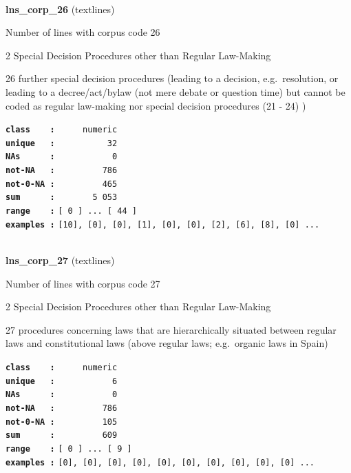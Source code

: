 \documentclass[]{article}
\begin{document}
~

\textbf{lns\_corp\_26} (textlines)

Number of lines with corpus code 26

2 Special Decision Procedures other than Regular Law-Making

26 further special decision procedures (leading to a decision,
e.g.~resolution, or leading to a decree/act/bylaw (not mere debate or
question time) but cannot be coded as regular law-making nor special
decision procedures (21 - 24) )

\textbf{\texttt{class\ \ \ \ :}} \texttt{~~~~~numeric}\\
\textbf{\texttt{unique\ \ \ :}} \texttt{~~~~~~~~~~32}\\
\textbf{\texttt{NAs\ \ \ \ \ \ :}} \texttt{~~~~~~~~~~~0}\\
\textbf{\texttt{not-NA\ \ \ :}} \texttt{~~~~~~~~~786}\\
\textbf{\texttt{not-0-NA\ :}} \texttt{~~~~~~~~~465}\\
\textbf{\texttt{sum\ \ \ \ \ \ :}} \texttt{~~~~~~~5~053}\\
\textbf{\texttt{range\ \ \ \ :}}
\texttt{{[}\ 0\ {]}\ ...\ {[}\ 44\ {]}}\\
\textbf{\texttt{examples\ :}}
\texttt{{[}10{]},\ {[}0{]},\ {[}0{]},\ {[}1{]},\ {[}0{]},\ {[}0{]},\ {[}2{]},\ {[}6{]},\ {[}8{]},\ {[}0{]}\ ...}\\

~

\textbf{lns\_corp\_27} (textlines)

Number of lines with corpus code 27

2 Special Decision Procedures other than Regular Law-Making

27 procedures concerning laws that are hierarchically situated between
regular laws and constitutional laws (above regular laws; e.g.~organic
laws in Spain)

\textbf{\texttt{class\ \ \ \ :}} \texttt{~~~~~numeric}\\
\textbf{\texttt{unique\ \ \ :}} \texttt{~~~~~~~~~~~6}\\
\textbf{\texttt{NAs\ \ \ \ \ \ :}} \texttt{~~~~~~~~~~~0}\\
\textbf{\texttt{not-NA\ \ \ :}} \texttt{~~~~~~~~~786}\\
\textbf{\texttt{not-0-NA\ :}} \texttt{~~~~~~~~~105}\\
\textbf{\texttt{sum\ \ \ \ \ \ :}} \texttt{~~~~~~~~~609}\\
\textbf{\texttt{range\ \ \ \ :}}
\texttt{{[}\ 0\ {]}\ ...\ {[}\ 9\ {]}}\\
\textbf{\texttt{examples\ :}}
\texttt{{[}0{]},\ {[}0{]},\ {[}0{]},\ {[}0{]},\ {[}0{]},\ {[}0{]},\ {[}0{]},\ {[}0{]},\ {[}0{]},\ {[}0{]}\ ...}\\
\end{document}
